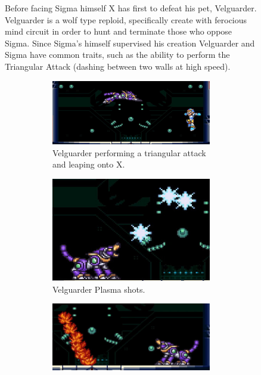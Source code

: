 \begin{figure}[htp]
Before facing Sigma himself X has first to defeat his pet, Velguarder.
Velguarder is a wolf type reploid, specifically create with ferocious mind circuit in order to hunt and terminate those who oppose Sigma. Since Sigma's himself supervised his creation Velguarder and Sigma have common traits, such as the ability to perform the Triangular Attack (dashing between two walls at high speed).
\begin{figure}[htp]
	\centering
	\begin{subfigure}{0.7\linewidth}
		\centering
		\includegraphics[width=\linewidth]{figures/X1/Sigma_stages/Velguarder_leap_1.jpg}
		\caption{Velguarder performing a triangular attack and leaping onto X.}
	\end{subfigure}
	\begin{subfigure}[t]{0.40\linewidth}
		\centering
		\includegraphics[width=\linewidth]{figures/X1/Sigma_stages/Velguarder_plasma.jpg}
		\caption{Velguarder Plasma shots.}
	\end{subfigure}
	\begin{subfigure}[t]{0.5\linewidth}
		\centering
		\includegraphics[width=\linewidth]{figures/X1/Sigma_stages/Velguarder_fire.jpg}

\end{subfigure}
\end{figure}
\end{figure}
